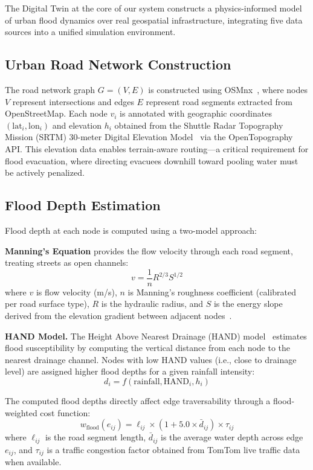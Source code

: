 \documentclass[journal]{IEEEtran}
\begin{document}
The Digital Twin at the core of our system constructs a physics-informed model
of urban flood dynamics over real geospatial infrastructure, integrating five
data sources into a unified simulation environment.

\subsection{Urban Road Network Construction}
The road network graph $G = (V, E)$ is constructed using
OSMnx~\cite{boeing2017osmnx}, where nodes $V$ represent intersections and
edges $E$ represent road segments extracted from OpenStreetMap. Each node $v_i$
is annotated with geographic coordinates $(\text{lat}_i, \text{lon}_i)$ and
elevation $h_i$ obtained from the Shuttle Radar Topography Mission (SRTM)
30-meter Digital Elevation Model~\cite{farr2007srtm} via the OpenTopography
API. This elevation data enables terrain-aware routing---a critical requirement
for flood evacuation, where directing evacuees downhill toward pooling water
must be actively penalized.

\subsection{Flood Depth Estimation}
Flood depth at each node is computed using a two-model approach:

\textbf{Manning's Equation} provides the flow velocity through each road
segment, treating streets as open channels:
\begin{equation}
    v = \frac{1}{n} R^{2/3} S^{1/2}
    \label{eq:manning}
\end{equation}
where $v$ is flow velocity (m/s), $n$ is Manning's roughness coefficient
(calibrated per road surface type), $R$ is the hydraulic radius, and $S$ is
the energy slope derived from the elevation gradient between adjacent
nodes~\cite{manning1891, chow1959}.

\textbf{HAND Model.} The Height Above Nearest Drainage (HAND)
model~\cite{nobre2011hand, renno2008hand} estimates flood susceptibility by
computing the vertical distance from each node to the nearest drainage
channel. Nodes with low HAND values (i.e., close to drainage level) are
assigned higher flood depths for a given rainfall intensity:
\begin{equation}
    d_i = f(\text{rainfall}, \text{HAND}_i, h_i)
    \label{eq:flood_depth}
\end{equation}

The computed flood depths directly affect edge traversability through a
flood-weighted cost function:
\begin{equation}
    w_{\text{flood}}(e_{ij}) = \ell_{ij} \times (1 + 5.0 \times \bar{d}_{ij})
    \times \tau_{ij}
    \label{eq:flood_weight}
\end{equation}
where $\ell_{ij}$ is the road segment length, $\bar{d}_{ij}$ is the average
water depth across edge $e_{ij}$, and $\tau_{ij}$ is a traffic congestion
factor obtained from TomTom live traffic data when available.
\end{document}
